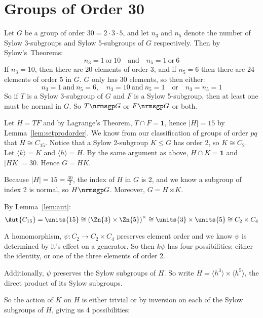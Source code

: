 \section{Groups of Order 30}
Let \(G\) be a group of order \(30 = 2 \cdot 3 \cdot 5\), and let \(n_3\) and \(n_5\) denote the number of Sylow
3-subgroups and Sylow 5-subgroups of \(G\) respectively.
Then by Sylow's~Theorems:
\[n_3 = 1 \ \text{or} \ 10 \quad \text{and} \quad n_5 = 1 \ \text{or} \ 6\]
If \(n_3 = 10\), then there are 20 elements of order 3, and if \(n_5 = 6\) then
there are 24 elements of order 5 in \(G\).
\(G\) only has 30 elements, so then either:
\[n_3 = 1 \ \text{and} \ n_5 = 6, \quad n_3 = 10 \ \text{and} \ n_5 = 1 \quad \text{or} \quad n_3 = n_5 = 1\]
So if \(T\) is a Sylow 3-subgroup of \(G\) and \(F\) is a Sylow 5-subgroup, then at least one must be normal in \(G\).
So \(T \nrmsgp G\) or \(F \nrmsgp G\) or both.

Let \(H = TF\) and by Lagrange's Theorem, \(T \cap F = \bm{1}\), hence \(|H| = 15\) by Lemma~\ref{lem:setprodorder}.
We know from our classification of groups of order \(pq\) that \(H \cong C_{15}\).
Notice that a Sylow 2-subgroup \(K \leqslant G\) has order 2, so \(K \cong C_2\).
Let \(\langle k \rangle = K\) and \(\langle h \rangle = H\).
By the same argument as above, \(H \cap K = \bm{1}\) and \(|HK| = 30\).
Hence \(G = HK\).

Because \(|H| = 15 = \frac{30}{2}\), the index of \(H\) in \(G\) is 2, and we know a subgroup of index 2 is normal, so
\(H \nrmsgp G\).
Moreover, \(G = H \rtimes K\).

By Lemma~\ref{lem:aut}:
\[\Aut{C_{15}} = \units{15} \cong {(\Zn{3} \times \Zn{5})}^\times \cong \units{3} \times \units{5} \cong C_2 \times C_4\]

A homomorphism, \(\psi:C_2 \to C_2 \times C_4\) preserves element order and we know \(\psi\) is determined by it's effect on a generator.
So then \(k\psi\) has four possibilities: either the identity, or one of the three elements
of order 2.

Additionally, \(\psi\) preserves the Sylow subgroups of \(H\).
So write \(H = \langle h^3 \rangle \times \langle h^5 \rangle\), the direct product of its Sylow subgroups.

So the action of \(K\) on \(H\) is either trivial or by inversion on each of the Sylow subgroups of \(H\), giving us 4
possibilities:

